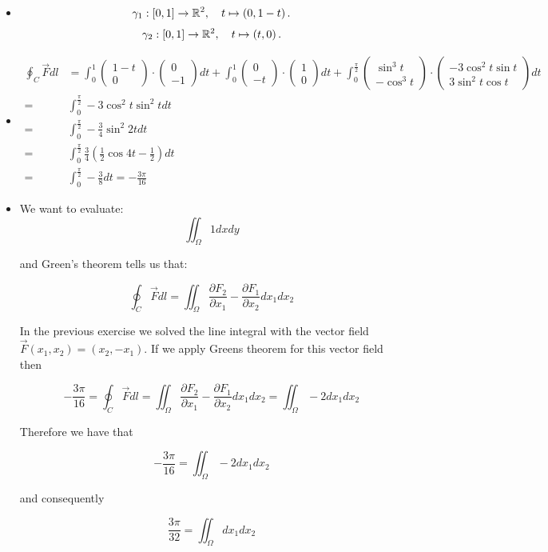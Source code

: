 \documentclass[11pt]{article}
\begin{document}
\begin{solution}     
\begin{itemize}
\item\begin{align*}
        \gamma_1 : \left[0,1\right] \to \mathbb{R}^2, \quad t \mapsto \left( 0, 1-t \right).
    \end{align*}
\begin{align*}
        \gamma_2 : \left[0,1\right] \to \mathbb{R}^2, \quad t \mapsto \left( t, 0 \right).
    \end{align*}
\item \begin{align*}
\oint_C \vec F dl &= \int_0^1 \begin{pmatrix} 1-t\\ 0\end{pmatrix}\cdot \begin{pmatrix} 0\\ -1\end{pmatrix}dt +  \int_0^1 \begin{pmatrix} 0\\ -t\end{pmatrix}\cdot \begin{pmatrix} 1\\ 0\end{pmatrix}dt +  \int_0^{\frac{\pi}{2}} \begin{pmatrix} \sin^3t\\ -\cos^3 t\end{pmatrix}\cdot \begin{pmatrix} -3\cos^2 t \sin t\\ 3\sin^2 t \cos t\end{pmatrix}dt\\
=&\int_0^{\frac{\pi}{2}} -3\cos^2 t\sin^2 tdt\\
=&\int_0^{\frac{\pi}{2}} -\frac{3}{4}\sin^2 2t dt\\
=&\int_0^{\frac{\pi}{2}} \frac{3}{4}\left(\frac{1}{2} \cos 4t - \frac{1}{2}\right)dt\\
=&\int_0^{\frac{\pi}{2}} -\frac{3}{8}dt = -\frac{3\pi}{16}
\end{align*}
\item We want to evaluate:
$$
\iint_{\Omega} 1 dxdy
$$

and Green's theorem tells us that:

$$
\oint_C \vec F dl  = \iint_{\Omega} \frac{\partial F_2}{\partial x_1} - \frac{\partial F_1}{\partial x_2} dx_1dx_2
$$

In the previous exercise we solved the line integral with the vector field $\vec F(x_1,x_2) = (x_2,-x_1)$. If we apply Greens theorem for this vector field then

$$
-\frac{3\pi}{16} = \oint_C \vec F dl  =  \iint_{\Omega} \frac{\partial F_2}{\partial x_1} - \frac{\partial F_1}{\partial x_2} dx_1dx_2 = \iint_{\Omega} -2 dx_1dx_2
$$

Therefore we have that

$$
-\frac{3\pi}{16} =  \iint_{\Omega} -2 dx_1dx_2
$$

and consequently 

$$
\frac{3\pi}{32} =  \iint_{\Omega} dx_1dx_2
$$
\end{itemize}
\end{solution}
\end{document}
